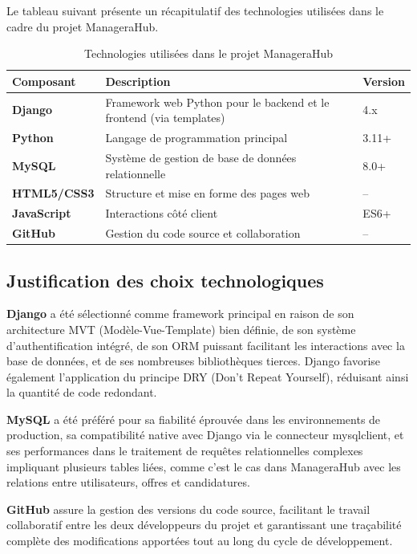 \documentclass[12pt,a4paper]{report}
\begin{document}
Le tableau suivant présente un récapitulatif des technologies utilisées dans le cadre du projet ManageraHub.

\begin{table}[H]
\centering
\caption{Technologies utilisées dans le projet ManageraHub}
\begin{tabularx}{\textwidth}{>{\bfseries}lXl}
\toprule
Composant & Description & Version \\
\midrule
Django & Framework web Python pour le backend et le frontend (via templates) & 4.x \\
Python & Langage de programmation principal & 3.11+ \\
MySQL & Système de gestion de base de données relationnelle & 8.0+ \\
HTML5/CSS3 & Structure et mise en forme des pages web & -- \\
JavaScript & Interactions côté client & ES6+ \\
GitHub & Gestion du code source et collaboration & -- \\
\bottomrule
\end{tabularx}
\end{table}

\subsection{Justification des choix technologiques}

\textbf{Django} a été sélectionné comme framework principal en raison de son architecture MVT (Modèle-Vue-Template) bien définie, de son système d'authentification intégré, de son ORM puissant facilitant les interactions avec la base de données, et de ses nombreuses bibliothèques tierces. Django favorise également l'application du principe DRY (Don't Repeat Yourself), réduisant ainsi la quantité de code redondant.

\textbf{MySQL} a été préféré pour sa fiabilité éprouvée dans les environnements de production, sa compatibilité native avec Django via le connecteur mysqlclient, et ses performances dans le traitement de requêtes relationnelles complexes impliquant plusieurs tables liées, comme c'est le cas dans ManageraHub avec les relations entre utilisateurs, offres et candidatures.

\textbf{GitHub} assure la gestion des versions du code source, facilitant le travail collaboratif entre les deux développeurs du projet et garantissant une traçabilité complète des modifications apportées tout au long du cycle de développement.
\end{document}
